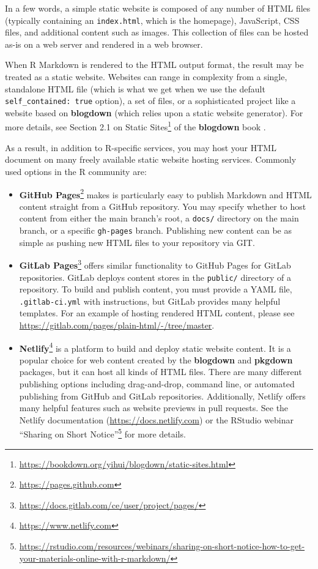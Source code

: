 \documentclass[
  11pt,
]{krantz}
\renewcommand{\href}[2]{#2\footnote{\url{#1}}}
\begin{document}
In a few words, a simple static website is composed of any number of HTML files (typically containing an \texttt{index.html}, which is the homepage), JavaScript, CSS files, and additional content such as images. This collection of files can be hosted as-is on a web server and rendered in a web browser.

When R Markdown is rendered to the HTML output format, the result may be treated as a static website. Websites can range in complexity from a single, standalone HTML file (which is what we get when we use the default \texttt{self\_contained:\ true} option), a set of files, or a sophisticated project like a website based on \textbf{blogdown} (which relies upon a static website generator). For more details, see \href{https://bookdown.org/yihui/blogdown/static-sites.html}{Section 2.1 on Static Sites} of the \textbf{blogdown} book \citep{blogdown2017}.

As a result, in addition to R-specific services, you may host your HTML document on many freely available static website hosting services. Commonly used options in the R community are:

\begin{itemize}
\item
  \href{https://pages.github.com}{\textbf{GitHub Pages}} makes is particularly easy to publish Markdown and HTML content straight from a GitHub repository. You may specify whether to host content from either the main branch's root, a \texttt{docs/} directory on the main branch, or a specific \texttt{gh-pages} branch. Publishing new content can be as simple as pushing new HTML files to your repository via GIT.
\item
  \href{https://docs.gitlab.com/ce/user/project/pages/}{\textbf{GitLab Pages}} offers similar functionality to GitHub Pages for GitLab repositories. GitLab deploys content stores in the \texttt{public/} directory of a repository. To build and publish content, you must provide a YAML file, \texttt{.gitlab-ci.yml} with instructions, but GitLab provides many helpful templates. For an example of hosting rendered HTML content, please see \url{https://gitlab.com/pages/plain-html/-/tree/master}.
\item
  \href{https://www.netlify.com}{\textbf{Netlify}} is a platform to build and deploy static website content. It is a popular choice for web content created by the \textbf{blogdown} and \textbf{pkgdown} packages, but it can host all kinds of HTML files. There are many different publishing options including drag-and-drop, command line, or automated publishing from GitHub and GitLab repositories. Additionally, Netlify offers many helpful features such as website previews in pull requests. See the Netlify documentation (\url{https://docs.netlify.com}) or the RStudio webinar \href{https://rstudio.com/resources/webinars/sharing-on-short-notice-how-to-get-your-materials-online-with-r-markdown/}{``Sharing on Short Notice''} for more details.
\end{itemize}
\end{document}
